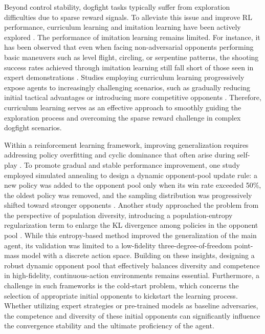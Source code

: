 \documentclass[pdflatex,sn-mathphys-num]{sn-jnl}%
\theoremstyle{thmstyleone}%
\theoremstyle{thmstyletwo}%
\theoremstyle{thmstylethree}%
\begin{document}
Beyond control stability, dogfight tasks typically suffer from exploration difficulties due to sparse reward signals. To alleviate this issue and improve RL performance, curriculum learning and imitation learning have been actively explored \cite{WANG2024109402, li_imitative_2025}. The performance of imitation learning remains limited. For instance, it has been observed that even when facing non-adversarial opponents performing basic maneuvers such as level flight, circling, or serpentine patterns, the shooting success rates achieved through imitation learning still fall short of those seen in expert demonstrations \cite{li_imitative_2025}. Studies employing curriculum learning progressively expose agents to increasingly challenging scenarios, such as gradually reducing initial tactical advantages or introducing more competitive opponents \cite{bae_deep_2023, kong_hierarchical, han_deep_2022, Selmonaj_2023}. Therefore, curriculum learning serves as an effective approach to smoothly guiding the exploration process and overcoming the sparse reward challenge in complex dogfight scenarios.

Within a reinforcement learning framework, improving generalization requires addressing policy overfitting and cyclic dominance that often arise during self-play \cite{han_augmenting_2025, chen_autonomous_2025}. To promote gradual and stable performance improvement, one study employed simulated annealing to design a dynamic opponent-pool update rule: a new policy was added to the opponent pool only when its win rate exceeded 50\%, the oldest policy was removed, and the sampling distribution was progressively shifted toward stronger opponents \cite{chen_autonomous_2025}. Another study approached the problem from the perspective of population diversity, introducing a population-entropy regularization term to enlarge the KL divergence among policies in the opponent pool \cite{han_augmenting_2025}. While this entropy-based method improved the generalization of the main agent, its validation was limited to a low-fidelity three-degree-of-freedom point-mass model with a discrete action space. Building on these insights, designing a robust dynamic opponent pool that effectively balances diversity and competence in high-fidelity, continuous-action environments remains essential. Furthermore, a challenge in such frameworks is the cold-start problem, which concerns the selection of appropriate initial opponents to kickstart the learning process. Whether utilizing expert strategies \cite{li_imitative_2025} or pre-trained models \cite{han_augmenting_2025} as baseline adversaries, the competence and diversity of these initial opponents can significantly influence the convergence stability and the ultimate proficiency of the agent.
\end{document}
